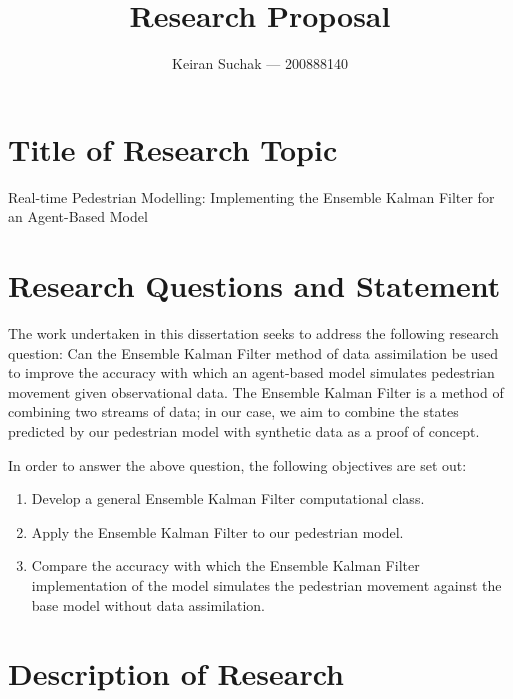 \documentclass[12pt, twoside, a4paper]{article}
\begin{document}


\title{Research Proposal}
\author{Keiran Suchak --- 200888140}
\maketitle

\section{Title of Research Topic}\label{sec:title}

Real-time Pedestrian Modelling: Implementing the Ensemble Kalman Filter for an
Agent-Based Model

\section{Research Questions and Statement}\label{sec:questions}


The work undertaken in this dissertation seeks to address the following research
question: Can the Ensemble Kalman Filter method of data assimilation be used to
improve the accuracy with which an agent-based model simulates pedestrian
movement given observational data.
The Ensemble Kalman Filter is a method of combining two streams of
data; in our case, we aim to combine the states predicted by our pedestrian
model with synthetic data as a proof of concept.

In order to answer the above question, the following objectives are set out:
\begin{enumerate}
    \item Develop a general Ensemble Kalman Filter computational class.
    \item Apply the Ensemble Kalman Filter to our pedestrian model.
    \item Compare the accuracy with which the Ensemble Kalman Filter
        implementation of the model simulates the pedestrian movement against
        the base model without data assimilation.
\end{enumerate}

\section{Description of Research}\label{sec:research_descr}
\end{document}
